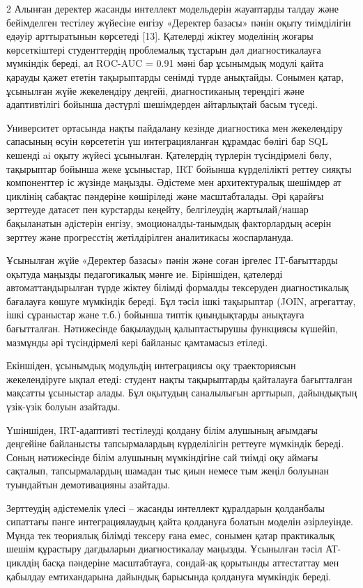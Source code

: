 \begin{multicols}{2}
Алынған деректер жасанды интеллект модельдерін жауаптарды талдау және
бейімделген тестілеу жүйесіне енгізу «Деректер базасы» пәнін оқыту
тиімділігін едәуір арттыратынын көрсетеді {[}13{]}. Қателерді жіктеу
моделінің жоғары көрсеткіштері студенттердің проблемалық тұстарын дәл
диагностикалауға мүмкіндік береді, ал ROC-AUC = 0.91 мәні бар ұсынымдық
модулі қайта қарауды қажет ететін тақырыптарды сенімді түрде анықтайды.
Сонымен қатар, ұсынылған жүйе жекелендіру деңгейі, диагностиканың
тереңдігі және адаптивтілігі бойынша дәстүрлі шешімдерден айтарлықтай
басым түседі.

Университет ортасында нақты пайдалану кезінде диагностика мен
жекелендіру сапасының өсуін көрсететін үш интеграцияланған құрамдас
бөлігі бар SQL кешенді ai оқыту жүйесі ұсынылған. Қателердің түрлерін
түсіндірмелі бөлу, тақырыптар бойынша жеке ұсыныстар, IRT бойынша
күрделілікті реттеу сияқты компоненттер іс жүзінде маңызды. Әдістеме мен
архитектуралық шешімдер ат циклінің сабақтас пәндеріне көшіріледі және
масштабталады. Әрі қарайғы зерттеуде датасет пен курстарды кеңейту,
белгілеудің жартылай/нашар бақыланатын әдістерін енгізу,
эмоционалды-танымдық факторлардың әсерін зерттеу және прогресстің
жетілдірілген аналитикасы жоспарлануда.

Ұсынылған жүйе «Деректер базасы» пәнін және соған іргелес IT-бағыттарды
оқытуда маңызды педагогикалық мәнге ие. Біріншіден, қателерді
автоматтандырылған түрде жіктеу білімді формалды тексеруден
диагностикалық бағалауға көшуге мүмкіндік береді. Бұл тәсіл ішкі
тақырыптар (JOIN, агрегаттау, ішкі сұраныстар және т.б.) бойынша типтік
қиындықтарды анықтауға бағытталған. Нәтижесінде бақылаудың
қалыптастырушы функциясы күшейіп, мазмұнды әрі түсіндірмелі кері
байланыс қамтамасыз етіледі.

Екіншіден, ұсынымдық модульдің интеграциясы оқу траекториясын
жекелендіруге ықпал етеді: студент нақты тақырыптарды қайталауға
бағытталған мақсатты ұсыныстар алады. Бұл оқытудың саналылығын арттырып,
дайындықтың үзік-үзік болуын азайтады.

Үшіншіден, IRT-адаптивті тестілеуді қолдану білім алушының ағымдағы
деңгейіне байланысты тапсырмалардың күрделілігін реттеуге мүмкіндік
береді. Соның нәтижесінде білім алушының мүмкіндігіне сай тиімді оқу
аймағы сақталып, тапсырмалардың шамадан тыс қиын немесе тым жеңіл
болуынан туындайтын демотивацияны азайтады.

Зерттеудің әдістемелік үлесі -- жасанды интеллект құралдарын қолданбалы
сипаттағы пәнге интеграциялаудың қайта қолдануға болатын моделін
әзірлеуінде. Мұнда тек теориялық білімді тексеру ғана емес, сонымен
қатар практикалық шешім құрастыру дағдыларын диагностикалау маңызды.
Ұсынылған тәсіл АТ-циклдің басқа пәндеріне масштабтауға, сондай-ақ
қорытынды аттестаттау мен қабылдау емтихандарына дайындық барысында
қолдануға мүмкіндік береді.


\end{multicols}
